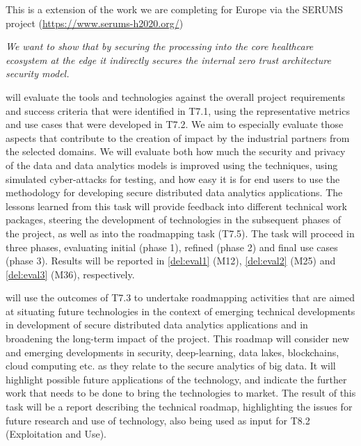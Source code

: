 \begin{Workpackage}{\thewpno}
\begin{Task}
This is a extension of the work we are completing for Europe via the SERUMS project (\url{https://www.serums-h2020.org/})


\emph{We want to show that by securing the processing into the core healthcare ecosystem at the edge it indirectly secures the internal zero trust architecture security model.}

\end{Task}

\begin{Task}
\TaskResults{%
}
\TaskHeader{}
\theTask{} will evaluate the \TheProject{} tools and technologies against the overall project requirements and success criteria that were identified in T7.1, using the representative metrics and use cases that were developed in T7.2. We aim to especially evaluate those aspects that contribute to the creation of impact by the industrial partners from the selected domains. We will evaluate both how much the security and privacy of the data and data analytics models is improved using the \TheProject{} techniques, using simulated cyber-attacks for testing, and how easy it is for end users to use the \TheProject{} methodology for developing secure distributed data analytics applications. The lessons learned from this task will provide feedback into different technical work packages, steering the development of \TheProject{} technologies in the subsequent phases of the project, as well as into the roadmapping task (T7.5). The task will proceed in three phases, evaluating initial (phase 1), refined (phase 2) and final use cases (phase 3). Results will be reported in \ref{del:eval1} (M12), \ref{del:eval2} (M25) and \ref{del:eval3} (M36), respectively. 
\end{Task}

\begin{Task}
  \TaskHeader{}
  \theTask{} will use the outcomes of T7.3 to undertake roadmapping activities that are aimed at situating future \TheProject{} technologies in the context of emerging technical developments in development of secure distributed data analytics applications and in broadening the long-term impact of the \TheProject{} project. This roadmap will consider new and emerging developments in security, deep-learning, data lakes, blockchains, cloud computing etc. as they relate to the secure analytics of big data. It will highlight possible future applications of the \TheProject{} technology, and indicate the further work that needs to be done to bring the \TheProject{} technologies to market. The result of this task will be a report describing the technical roadmap, highlighting the issues for future research and use of \TheProject{} technology, also being used as input for T8.2 (Exploitation and Use). 
  \end{Task}
  

\end{Workpackage}
